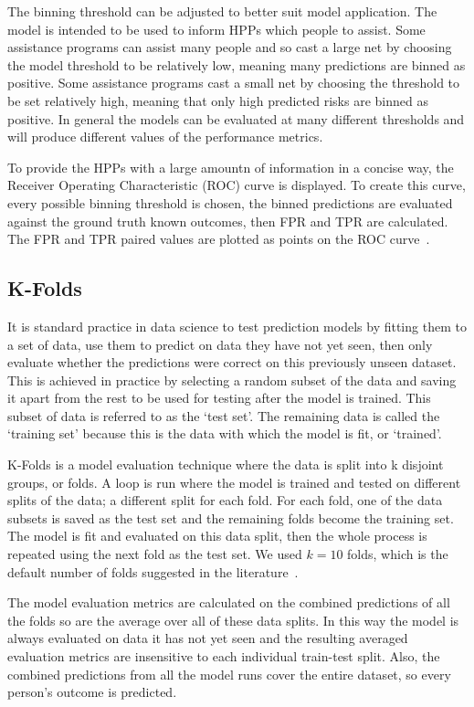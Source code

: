 \documentclass[10pt,letterpaper]{article}
\newcommand{\red}[1]{{\color{red}{#1}}}
\begin{document}
The binning threshold can be adjusted to better suit model application. The model is intended to be used to inform HPPs which people to assist. Some assistance programs can assist many people and so cast a large net by choosing the model threshold to be relatively low, meaning many predictions are binned as positive. Some assistance programs cast a small net by choosing the threshold to be set relatively high, meaning that only high predicted risks are binned as positive. In general the models can be evaluated at many different thresholds and will produce different values of the performance metrics.

To provide the HPPs with a large amountn of information in a concise way, the Receiver Operating Characteristic (ROC) curve is displayed. To create this curve, every possible binning threshold is chosen, the binned predictions are evaluated against the ground truth known outcomes, then FPR and TPR are calculated. The FPR and TPR paired values are plotted as points on the ROC curve~\cite{fawcett2006introduction}.

\subsection*{K-Folds}
It is standard practice in data science to test prediction models by fitting them to a set of data, use them to predict on data they have not yet seen, then only evaluate whether the predictions were correct on this previously unseen dataset. This is achieved in practice by selecting a random subset of the data and saving it apart from the rest to be used for testing after the model is trained. This subset of data is referred to as the `test set'. The remaining data is called the `training set' because this is the data with which the model is fit, or `trained'. \red{remove previous paragraph?}

K-Folds is a model evaluation technique where the data is split into k disjoint groups, or folds. A loop is run where the model is trained and tested on different splits of the data; a different split for each fold. For each fold, one of the data subsets is saved as the test set and the remaining folds become the training set. The model is fit and evaluated on this data split, then the whole process is repeated using the next fold as the test set. We used $k = 10$ folds, which is the default number of folds suggested in the literature~\cite{marcot2020optimal}.

The model evaluation metrics are calculated on the combined predictions of all the folds so are the average over all of these data splits. In this way the model is always evaluated on data it has not yet seen and the resulting averaged evaluation metrics are insensitive to each individual train-test split. Also, the combined predictions from all the model runs cover the entire dataset, so every person's outcome is predicted.
\end{document}
